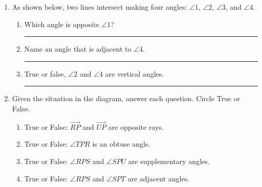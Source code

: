 \begin{enumerate}
\item As shown below, two lines intersect making four angles: $\angle 1$, $\angle 2$, $\angle 3$, and $\angle 4$.
\begin{center}
\end{center}
\begin{enumerate}
\item Which angle is opposite $\angle 1$? \rule{4cm}{0.15mm} \bigskip
\item Name an angle that is adjacent to $\angle 4$. \rule{4cm}{0.15mm} \bigskip
\item True or false, $\angle 2$ and $\angle 4$ are vertical angles. \rule{3cm}{0.15mm}
\end{enumerate}

\item Given the situation in the diagram, answer each question. Circle True or False.
  \begin{center}
  \end{center}
  \begin{enumerate}
  \item True or False: $\overrightarrow{RP}$ and $\overrightarrow{UP}$ are opposite rays.\bigskip
  \item True or False: $\angle TPR$ is an obtuse angle.\bigskip
  \item True or False: $\angle RPS$ and $\angle SPU$ are supplementary angles.\bigskip
  \item True or False: $\angle RPS$ and $\angle SPT$ are adjacent angles. \bigskip
  \end{enumerate}


\end{enumerate}
